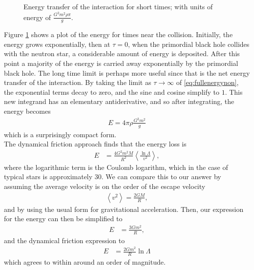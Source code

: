 \begin{figure}[p]
 
 \caption[Analytic Energy Transfer]{Energy transfer of the interaction for short times; with units of energy of $\frac{G^2 m^2 \rho \pi}{g}$.}
 \label{fig:energy}
\end{figure}

Figure \ref{fig:energy} shows a plot of the energy for times near the collision. Initially, the energy grows exponentially, then at $\tau=0$, when the primordial black hole collides with the neutron star, a considerable amount of energy is deposited. After this point a majority of the energy is carried away exponentially by the primordial black hole. The long time limit is perhaps more useful since that is the net energy transfer of the interaction. By taking the limit as $\tau \rightarrow \infty$ of \eqref{eq:fullenergynon}, the exponential terms decay to zero, and the sine and cosine simplify to $1$. This new integrand has an elementary antiderivative, and so after integrating, the energy becomes
\begin{align}
\label{eq:energy}
E = 4 \pi \rho \frac{G^2 m^2}{g}
\end{align}
which is a surprisingly compact form. \\

The dynamical friction approach \cite{dynamicalfriction} finds that the energy loss is
\begin{align*}
E &= \frac{4 G^2 m^2 M}{R^2} \left< \frac{\ln \Lambda}{v^2} \right>,
\end{align*}
where the logarithmic term is the Coulomb logarithm, which in the case of typical stars is approximately $30$. We can compare this to our answer by assuming the average velocity is on the order of the escape velocity
\begin{align*}
\left< v^2 \right> = \frac{2GM}{R},
\end{align*}
and by using the usual form for gravitational acceleration. Then, our expression for the energy can then be simplified to
\begin{align*}
E &= \frac{3Gm^2}{R},
\end{align*}
and the dynamical friction expression to
\begin{align*}
E &= \frac{2Gm^2}{R} \ln \Lambda
\end{align*}
which agrees to within around an order of magnitude.




%
















